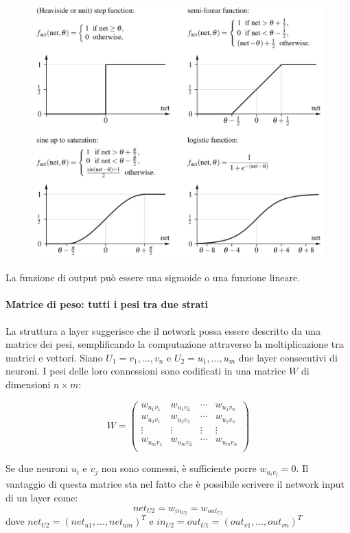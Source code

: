 \begin{figure}[h]
    \centering
    \includegraphics[scale=0.3]{images/fact.png}
\end{figure}

La funzione di output può essere una sigmoide o una funzione lineare. 

\paragraph{Matrice di peso: tutti i pesi tra due strati}
La struttura a layer suggerisce che il network possa essere descritto da una matrice dei pesi, semplificando la computazione attraverso la moltiplicazione tra matrici e vettori. Siano $U_1={v_1, \dots ,v_n}$ e $U_2={u_1, \dots ,u_m}$ due layer consecutivi di neuroni. I pesi delle loro connessioni sono codificati in una matrice $W$ di dimensioni $n \times m$:
\begin{center}$$
    W=\begin{pmatrix}
        w_{u_1v_1} & w_{u_1v_2} & \cdots & w_{u_1v_n} \\
        w_{u_2v_1} & w_{u_2v_2} & \cdots & w_{u_2v_n} \\
        \vdots & \vdots & \vdots & \vdots \\
        w_{u_mv_1} & w_{u_mv_2} & \cdots & w_{u_mv_n} \\
    \end{pmatrix}$$
\end{center}
Se due neuroni $u_i$ e $v_j$ non sono connessi, è sufficiente porre $w_{u_iv_j}=0$. Il vantaggio di questa matrice sta nel fatto che è possibile scrivere il network input di un layer come:
$$net_{U2}=w_{in_{U2}}=w_{out_{U1}}$$
dove $net_{U2}=(net_{u1},\dots,net_{um})^T$ e $in_{U2}=out_{U1}= (out_{v1},\dots,out_{vn})^T$

